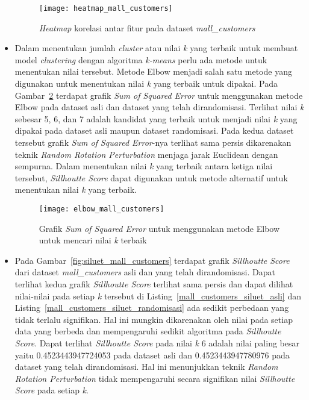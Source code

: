 \begin{itemize}
	\begin{figure}
		\centering
		\texttt{[image: heatmap\_mall\_customers]}
		\caption{\textit{Heatmap} korelasi antar fitur pada dataset \textit{mall\_customers}}
		\label{fig:heatmap_mall_customers}
	\end{figure}

	\item Dalam menentukan jumlah \textit{cluster} atau nilai \textit{k} yang terbaik untuk membuat model \textit{clustering} dengan algoritma \textit{k-means} perlu ada metode untuk menentukan nilai tersebut. Metode Elbow menjadi salah satu metode yang digunakan untuk menentukan nilai \textit{k} yang terbaik untuk dipakai. Pada Gambar~\ref{fig:elbow_mall_customers} terdapat grafik \textit{Sum of Squared Error} untuk menggunakan metode Elbow pada dataset asli dan dataset yang telah dirandomisasi. Terlihat nilai \textit{k} sebesar 5, 6, dan 7 adalah kandidat yang terbaik untuk menjadi nilai \textit{k} yang dipakai pada dataset asli maupun dataset randomisasi. Pada kedua dataset tersebut grafik \textit{Sum of Squared Error}-nya terlihat sama persis dikarenakan teknik \textit{Random Rotation Perturbation} menjaga jarak Euclidean dengan sempurna. Dalam menentukan nilai \textit{k} yang terbaik antara ketiga nilai tersebut, \textit{Sillhoutte Score} dapat digunakan untuk metode alternatif untuk menentukan nilai \textit{k} yang terbaik.

	\begin{figure}
		\centering
		\texttt{[image: elbow\_mall\_customers]}
		\caption{Grafik \textit{Sum of Squared Error} untuk menggunakan metode Elbow untuk mencari nilai \textit{k} terbaik}
		\label{fig:elbow_mall_customers}
	\end{figure}

	\item Pada Gambar~\ref{fig:siluet_mall_customers} terdapat grafik \textit{Sillhoutte Score} dari dataset \textit{mall\_customers} asli dan yang telah dirandomisasi. Dapat terlihat kedua grafik \textit{Sillhoutte Score} terlihat sama persis dan dapat dilihat nilai-nilai pada setiap \textit{k} tersebut di Listing~\ref{mall_customers_siluet_asli} dan Listing~\ref{mall_customers_siluet_randomisasi} ada sedikit perbedaan yang tidak terlalu signifikan. Hal ini mungkin dikarenakan oleh nilai pada setiap data yang berbeda dan mempengaruhi sedikit algoritma pada \textit{Sillhoutte Score}. Dapat terlihat \textit{Sillhoutte Score} pada nilai \textit{k} 6 adalah nilai paling besar yaitu 0.4523443947724053 pada dataset asli dan 0.4523443947780976 pada dataset yang telah dirandomisasi. Hal ini menunjukkan teknik \textit{Random Rotation Perturbation} tidak mempengaruhi secara signifikan nilai \textit{Sillhoutte Score} pada setiap \textit{k}.


\end{itemize}
